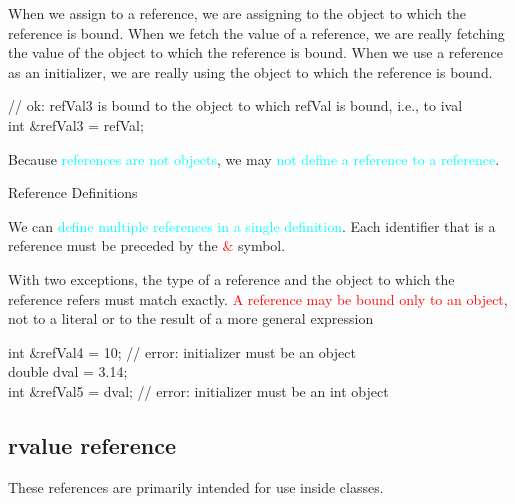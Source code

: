 \documentclass[12pt,a4paper]{article}
\begin{document}
When we assign to a reference, we are assigning to the object to which the reference is bound. When we fetch the value of a reference, we are really fetching the value of the object to which the reference is bound. When we use a reference as an initializer, we are really using the object to which the reference is bound.

// ok: refVal3 is bound to the object to which refVal is bound, i.e., to ival \\
int $\&$refVal3 = refVal;

Because \textcolor{cyan}{references are not objects}, we may \textcolor{cyan}{not define a reference to a reference}.

Reference Definitions

We can \textcolor{cyan}{define multiple references in a single definition}. Each identifier that is a reference must be preceded by the \textcolor{red}{$\&$} symbol.

With two exceptions, the type of a reference and the object to which the reference refers must match exactly. \textcolor{red}{A reference may be bound only to an object}, not to a literal or to the result of a more general expression

int $\&$refVal4 = 10; // error: initializer must be an object \\
double dval = 3.14; \\
int $\&$refVal5 = dval; // error: initializer must be an int object

\subsection{rvalue reference}
These references are primarily intended for use inside classes. 
\end{document}

